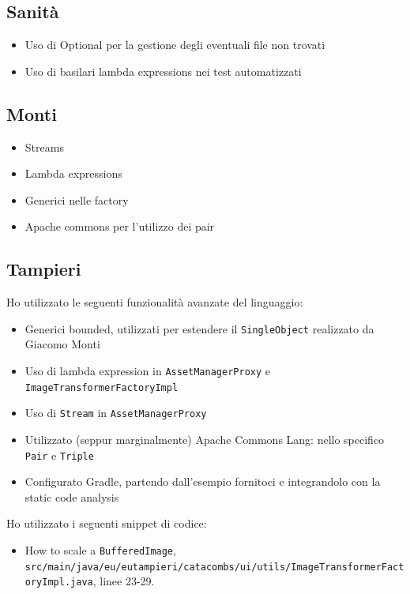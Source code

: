 \documentclass[a4paper,12pt]{report}
\begin{document}
    \subsection{Sanità}
    \begin{itemize}
        \item Uso di Optional per la gestione degli eventuali file non trovati
        \item Uso di basilari lambda expressions nei test automatizzati
    \end{itemize}
    \subsection{Monti}
    \begin{itemize}
        \item Streams
        \item Lambda expressions
        \item Generici nelle factory
        \item Apache commons per l'utilizzo dei pair
    \end{itemize}
    \subsection{Tampieri}
    \par Ho utilizzato le seguenti funzionalità avanzate del linguaggio:
    \begin{itemize}
        \item Generici bounded, utilizzati per estendere il \texttt{SingleObject} realizzato da Giacomo Monti
        \item Uso di lambda expression in \texttt{AssetManagerProxy} e \texttt{ImageTransformerFactoryImpl}
        \item Uso di \texttt{Stream} in \texttt{AssetManagerProxy}
        \item Utilizzato (seppur marginalmente) Apache Commons Lang: nello specifico \texttt{Pair} e \texttt{Triple}
        \item Configurato Gradle, partendo dall'esempio fornitoci e integrandolo con la static code analysis
    \end{itemize}
    \par Ho utilizzato i seguenti snippet di codice:
    \begin{itemize}
        \item How to scale a \texttt{BufferedImage}\cite{so:BufferedImageScaling},\\\texttt{src/main/java/eu/eutampieri/catacombs/ui/utils/ImageTransformerFactoryImpl.java}, linee 23-29.
    \end{itemize}
\end{document}
